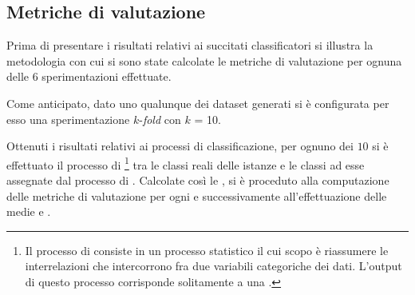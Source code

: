 \subsection{Metriche di valutazione}
Prima di presentare i risultati relativi ai succitati classificatori si illustra la metodologia con cui si sono state calcolate le metriche di valutazione per ognuna delle $6$ sperimentazioni effettuate.

Come anticipato, dato uno qualunque dei dataset generati si è configurata per esso una sperimentazione $k$-\emph{fold } con $k$ = 10.

Ottenuti i risultati relativi ai processi di classificazione, per ognuno dei $10$ \emph{} si è effettuato il processo di \emph{}\footnote{Il processo di  consiste in un processo statistico il cui scopo è riassumere le interrelazioni che intercorrono fra due variabili categoriche dei dati. L'output di questo processo corrisponde solitamente a una \emph{}.} tra le classi reali delle istanze e le classi ad esse assegnate dal processo di \emph{}. Calcolate così le \emph{}, si è proceduto alla computazione delle metriche di valutazione per ogni \emph{} e successivamente all'effettuazione delle medie \emph{} e \emph{}.

